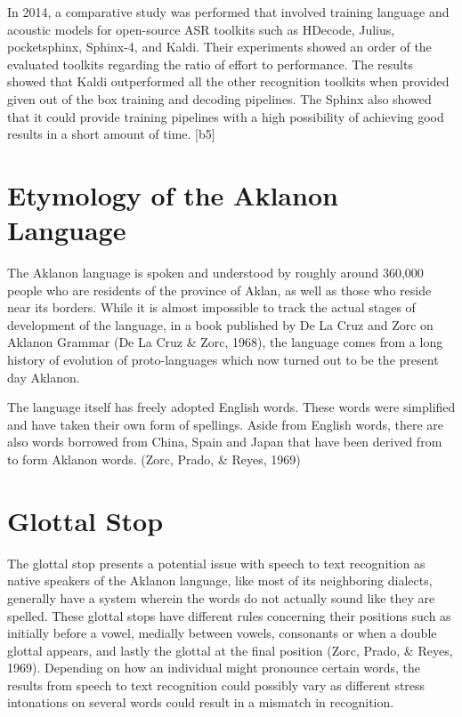 In 2014, a comparative study was performed that involved training language and acoustic models for open-source ASR toolkits such as HDecode, Julius, pocketsphinx, Sphinx-4, and Kaldi. Their experiments showed an order of the evaluated toolkits regarding the ratio of effort to performance. The results showed that Kaldi outperformed all the other recognition toolkits when provided given out of the box training and decoding pipelines. The Sphinx also showed that it could provide training pipelines with a high possibility of achieving good results in a short amount of time.  [b5]


\section{Etymology of the Aklanon Language}

The Aklanon language is spoken and understood by roughly around 360,000 people who are residents of the province of Aklan, as well as those who reside near its borders. While it is almost impossible to track the actual stages of development of the language, in a book published by De La Cruz and Zorc on Aklanon Grammar (De La Cruz \& Zorc, 1968), the language comes from a long history of evolution of proto-languages which now turned out to be the present day Aklanon. 

The language itself has freely adopted English words. These words were simplified and have taken their own form of spellings. Aside from English words, there are also words borrowed from China, Spain and Japan that have been derived from to form Aklanon words. (Zorc, Prado, \& Reyes, 1969)

\section{Glottal Stop}

The glottal stop presents a potential issue with speech to text recognition as native speakers of the Aklanon language, like most of its neighboring dialects, generally have a system wherein the words do not actually sound like they are spelled. These glottal stops have different rules concerning their positions such as initially before a vowel, medially between vowels, consonants or when a double glottal appears, and lastly the glottal at the final position (Zorc, Prado, \& Reyes, 1969). Depending on how an individual might pronounce certain words, the results from speech to text recognition could possibly vary as different stress intonations on several words could result in a mismatch in recognition.

